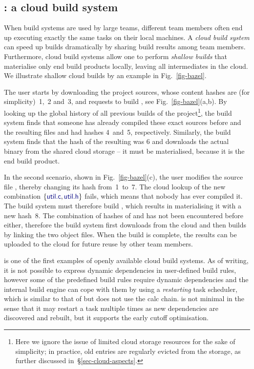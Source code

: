 \subsection{\Bazel: a cloud build system}
\label{sec-background-bazel}

When build systems are used by large teams, different team members often end up
executing exactly the same tasks on their local machines. A \emph{cloud build
system} can speed up builds dramatically by sharing build results
among team members. Furthermore, cloud build systems allow one to perform
\emph{shallow builds} that materialise only end build products locally, leaving
all intermediates in the cloud. We illustrate shallow cloud builds by an example
in Fig.~\ref{fig-bazel}.

The user starts by downloading the project sources, whose content hashes are
(for simplicity)~1,~2 and~3, and requests to build , see
Fig.~\ref{fig-bazel}(a,b). By looking up the global history of all previous
builds of the project\footnote{Here we ignore the issue of limited cloud storage
resources for the sake of simplicity; in practice, old entries are regularly
evicted from the storage, as further discussed in~\S\ref{sec-cloud-aspects}.},
the build system finds that someone has already compiled these exact sources
before and the resulting files  and  had hashes
4~and~5, respectively. Similarly, the build system finds that the hash of the
resulting  was 6 and downloads the actual binary from the shared
cloud storage -- it must be materialised, because it is the end build product.

In the second scenario, shown in Fig.~\ref{fig-bazel}(c), the user modifies the
source file , thereby changing its hash from~1~to~7. The cloud
lookup of the new combination $\{\cmd{util.c}, \cmd{util.h}\}$ fails,
which means that nobody has ever compiled it. The build system must therefore
build , which results in materialising it with a new hash~8. The
combination of hashes of  and  has not been encountered
before either, therefore the build system first downloads  from the
cloud and then builds  by linking the two object files. When the
build is complete, the results can be uploaded to the cloud for future reuse by
other team members.

\Bazel is one of the first examples of openly available cloud build systems.
As of writing, it is not possible to express dynamic dependencies in
user-defined build rules, however some of the predefined build rules require
dynamic dependencies and the internal build engine can cope with them by using
a \emph{restarting} task scheduler, which is similar to that of \Excel but does
not use the calc chain. \Bazel is not minimal in the sense that it may restart a
task multiple times as new dependencies are discovered and rebuilt, but it
supports the early cutoff optimisation.

